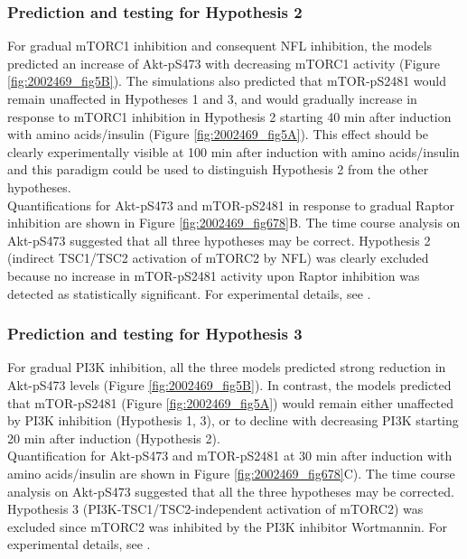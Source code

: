 \subsubsection{Prediction and testing for Hypothesis 2}
\label{paper1-subsubsec:Prediction and testing for Hypothesis 2}
For gradual mTORC1 inhibition and consequent NFL inhibition, the models predicted an increase of Akt-pS473 with decreasing mTORC1 activity (Figure \ref{fig:2002469_fig5B}). The simulations also predicted that mTOR-pS2481 would remain unaffected in Hypotheses 1 and 3, and would gradually increase in response to mTORC1 inhibition in Hypothesis 2 starting 40 min after induction with amino acids/insulin (Figure \ref{fig:2002469_fig5A}). This effect should be clearly experimentally visible at 100 min after induction with amino acids/insulin and this paradigm could be used to distinguish Hypothesis 2 from the other hypotheses. \\
Quantifications for Akt-pS473 and mTOR-pS2481 in response to gradual Raptor inhibition are shown in Figure \ref{fig:2002469_fig678}B. The time course analysis on Akt-pS473 suggested that all three hypotheses may be correct. Hypothesis 2 (indirect TSC1/TSC2 activation of mTORC2 by NFL) was clearly excluded because no increase in mTOR-pS2481 activity upon Raptor inhibition was detected as statistically significant. For experimental details, see \citep[Fig. 7]{DallePezze2012a}.
\subsubsection{Prediction and testing for Hypothesis 3}
\label{paper1-subsubsec:Prediction and testing for Hypothesis 3}
For gradual PI3K inhibition, all the three models predicted strong reduction in Akt-pS473 levels (Figure \ref{fig:2002469_fig5B}). In contrast, the models predicted that mTOR-pS2481 (Figure \ref{fig:2002469_fig5A}) would remain either unaffected by PI3K inhibition (Hypothesis 1, 3), or to decline with decreasing PI3K starting 20 min after induction (Hypothesis 2). \\ 
Quantification for Akt-pS473 and mTOR-pS2481 at 30 min after induction with amino acids/insulin are shown in Figure \ref{fig:2002469_fig678}C). The time course analysis on Akt-pS473 suggested that all the three hypotheses may be corrected. Hypothesis 3 (PI3K-TSC1/TSC2-independent activation of mTORC2) was excluded since mTORC2 was inhibited by the PI3K inhibitor Wortmannin. For experimental details, see \citep[Fig. 8]{DallePezze2012a}.

